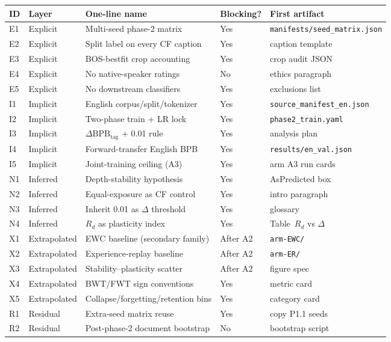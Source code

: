 \documentclass[11pt,a4paper]{article}
\begin{document}
\begin{center}
\small
\begin{tabular}{lllll}
\toprule
ID & Layer & One-line name & Blocking? & First artifact \\
\midrule
E1 & Explicit & Multi-seed phase-2 matrix & Yes & \texttt{manifests/seed\_matrix.json} \\
E2 & Explicit & Split label on every CF caption & Yes & caption template \\
E3 & Explicit & BOS-bestfit crop accounting & Yes & crop audit JSON \\
E4 & Explicit & No native-speaker ratings & No & ethics paragraph \\
E5 & Explicit & No downstream classifiers & Yes & exclusions list \\
I1 & Implicit & English corpus/split/tokenizer & Yes & \texttt{source\_manifest\_en.json} \\
I2 & Implicit & Two-phase train + LR lock & Yes & \texttt{phase2\_train.yaml} \\
I3 & Implicit & $\Delta\mathrm{BPB}_{\mathrm{tag}}$ + 0.01 rule & Yes & analysis plan \\
I4 & Implicit & Forward-transfer English BPB & Yes & \texttt{results/en\_val.json} \\
I5 & Implicit & Joint-training ceiling (A3) & Yes & arm A3 run cards \\
N1 & Inferred & Depth-stability hypothesis & Yes & AsPredicted box \\
N2 & Inferred & Equal-exposure as CF control & Yes & intro paragraph \\
N3 & Inferred & Inherit 0.01 as $\Delta$ threshold & Yes & glossary \\
N4 & Inferred & $R_d$ as plasticity index & Yes & Table~$R_d$ vs $\Delta$ \\
X1 & Extrapolated & EWC baseline (secondary family) & After A2 & \texttt{arm-EWC/} \\
X2 & Extrapolated & Experience-replay baseline & After A2 & \texttt{arm-ER/} \\
X3 & Extrapolated & Stability--plasticity scatter & After A2 & figure spec \\
X4 & Extrapolated & BWT/FWT sign conventions & Yes & metric card \\
X5 & Extrapolated & Collapse/forgetting/retention bins & Yes & category card \\
R1 & Residual & Extra-seed matrix reuse & Yes & copy P1.1 seeds \\
R2 & Residual & Post-phase-2 document bootstrap & No & bootstrap script \\

\end{tabular}
\end{center}
\end{document}
